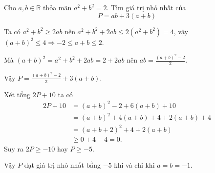 \begin{problem}
	Cho $a, b \in \mathbb{R}$ thỏa mãn $a^2 + b^2 = 2$. Tìm giá trị nhỏ nhất của
	\[
		P = ab + 3(a + b)
	\]
	\solution

	Ta có $a^2 + b^2 \ge 2ab$ nên $a^2 + b^2 + 2ab \le 2(a^2 + b^2) = 4$, vậy $(a + b)^2 \le 4 \Rightarrow -2 \le a + b \le 2$.

	Mà $(a + b)^2 = a^2 + b^2 + 2ab = 2 + 2ab$ nên $ab = \displaystyle \frac{(a + b)^2 - 2}{2}$.

	Vậy $P = \displaystyle \frac{(a + b)^2 - 2}{2} + 3(a + b)$.

	Xét tổng $2P + 10$ ta có
	\begin{align*}
		2P + 10 &= (a + b)^2 - 2 + 6(a + b) + 10 \\
			    &= (a + b)^2 + 4(a + b) + 4 + 2(a + b) + 4 \\
			    &= (a + b + 2)^2 + 4 + 2(a + b) \\
			    &\ge 0 + 4 - 4 = 0.
 	\end{align*}
 	Suy ra $2P \ge -10$ hay $P \ge -5$.

 	Vậy $P$ đạt giá trị nhỏ nhất bằng $-5$ khi và chỉ khi $a = b = -1$.
\end{problem}